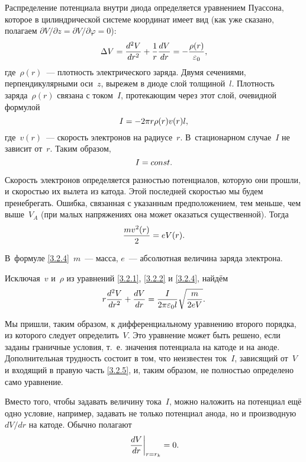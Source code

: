 Распределение потенциала внутри диода определяется уравнением Пуассона, которое
в цилиндрической системе координат имеет вид (как уже сказано, полагаем
$\partial V/\partial z=\partial V/\partial\varphi=0$):
\begin{equation}
	\Delta V=\frac{d^2 V}{dr^2}+\frac{1}{r}\frac{dV}{dr}=-
    \frac{\rho(r)}{\varepsilon_0},
	\eqmark{3.2.1}
\end{equation}
где~$\rho(r)$~--- плотность электрического заряда. Двумя сечениями,
перпендикулярными оси~$z$, вырежем в диоде слой
толщиной~$l$. Плотность заряда~$\rho(r)$ связана с током~$I$, протекающим через
этот слой, очевидной формулой
\begin{equation}
	I=-2\pi r\rho(r)v(r)l,
	\eqmark{3.2.2}
\end{equation}
где~$v(r)$~--- скорость электронов на радиусе~$r$. В~стационарном случае~$I$ не
зависит от~$r$. Таким образом,
\begin{equation}
	I=const.
	\eqmark{3.2.3}
\end{equation}

Скорость электронов определяется разностью потенциалов, которую они прошли, и
скоростью их вылета из катода. Этой
последней скоростью мы будем пренебрегать. Ошибка, связанная с указанным
предположением, тем меньше, чем выше~$V_A$ (при малых напряжениях она может
оказаться существенной). Тогда
\begin{equation}
	\frac{mv^2(r)}{2}=eV(r).
	\eqmark{3.2.4}
\end{equation}

В~формуле \eqref{3.2.4}~$m$~--- масса, $e$~--- абсолютная величина заряда
электрона.

Исключая~$v$ и~$\rho$ из уравнений \eqref{3.2.1}, \eqref{3.2.2} и \eqref{3.2.4},
найдём
\begin{equation}
r\frac{d^2V}{dr^2}+\frac{dV}{dr}=
\frac{I}{2\pi\varepsilon_0l}\sqrt{\frac{m}{2eV}}.
	\eqmark{3.2.5}
\end{equation}

Мы пришли, таким образом, к дифференциальному уравнению второго порядка, из
которого следует определить~$V$. Это
уравнение может быть решено, если заданы граничные условия, т.~е. значения
потенциала на катоде и на аноде.
Дополнительная трудность состоит в том, что неизвестен ток~$I$, зависящий от~$V$
и входящий в правую часть \eqref{3.2.5}, и, таким образом, не полностью
определено само уравнение.

Вместо того, чтобы задавать величину тока~$I$, можно наложить на потенциал ещё
одно условие, например, задавать не только потенциал анода, но и производную
$dV/dr$ на катоде. Обычно полагают
\begin{equation}
	\left.\frac{dV}{dr}\right|_{r=r_k}=0.
	\eqmark{3.2.6}
\end{equation}

